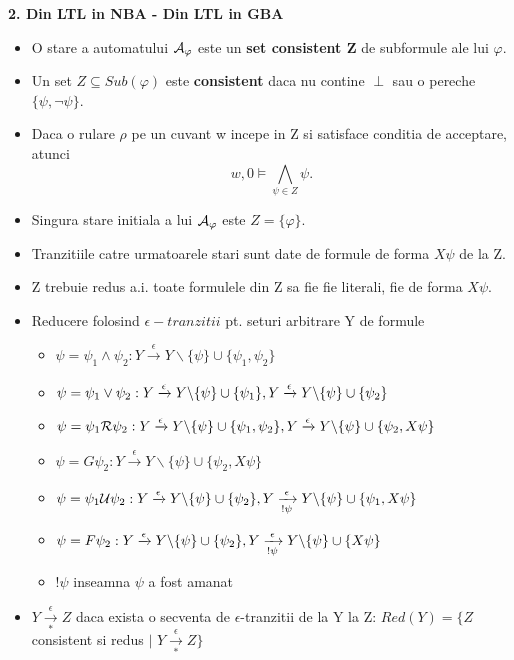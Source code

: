 \documentclass[10pt,a4paper,twocolumn]{report}
\begin{document}
\textbf{2. Din LTL in NBA - Din LTL in GBA}
\begin{itemize}
	\item  O stare a automatului $\mathcal{A}_\varphi$ este un \textbf{set consistent Z} de subformule ale lui $\varphi$.
	\item Un set $Z \subseteq Sub(\varphi)$ este \textbf{consistent} daca nu contine $\perp$ sau o pereche $\{\psi, \neg \psi\}$.
	\item Daca o rulare $\rho$ pe un cuvant w incepe in Z si satisface conditia de acceptare, atunci
	\[w,0 \models \bigwedge_{\psi\in Z} \psi.\]
	\item Singura stare initiala a lui $\mathcal{A}_\varphi$ este $Z = \{\varphi\}$.
	\item Tranzitiile catre urmatoarele stari sunt date de formule de forma $X\psi$ de la Z.
	\item Z trebuie redus a.i. toate formulele din Z sa fie fie literali, fie de forma $X\psi$.
	\item Reducere folosind \textbf{$\epsilon-tranzitii$} pt. seturi arbitrare Y de formule
	\begin{itemize}
		\item $\psi = \psi_1 \land \psi_2: Y \xrightarrow[]{\epsilon}Y\backslash\{\psi\} \cup \{\psi_1, \psi_2\}$
		\item $\psi = \psi_1 \lor \psi_2: Y \xrightarrow[]{\epsilon}Y\backslash\{\psi\} \cup \{\psi_1\},\\ Y \xrightarrow[]{\epsilon}Y\backslash\{\psi\} \cup \{\psi_2\}$
		\item $\psi = \psi_1 \mathcal{R} \psi_2: Y \xrightarrow[]{\epsilon}Y\backslash\{\psi\} \cup \{\psi_1, \psi_2\},\\ Y \xrightarrow[]{\epsilon}Y\backslash\{\psi\} \cup \{\psi_2, X\psi\}$
		\item $\psi = G\psi_2: Y \xrightarrow[]{\epsilon}Y\backslash\{\psi\} \cup \{\psi_2, X\psi\}$
		\item $\psi = \psi_1 \mathcal{U} \psi_2: Y \xrightarrow[]{\epsilon}Y\backslash\{\psi\} \cup \{\psi_2\},\\ Y \xrightarrow[!\psi]{\epsilon}Y\backslash\{\psi\} \cup \{\psi_1, X\psi\}$
		\item $\psi = F\psi_2: Y \xrightarrow[]{\epsilon}Y\backslash\{\psi\} \cup \{\psi_2\},\\ Y \xrightarrow[!\psi]{\epsilon}Y\backslash\{\psi\} \cup \{X\psi\}$
		\item $!\psi$ inseamna $\psi$ a fost amanat
	\end{itemize}
	\item $Y \xrightarrow[*]{\epsilon}Z$ daca exista o secventa de $\epsilon$-tranzitii de la Y la Z: $Red(Y) = \{Z$ consistent si redus $|$ $Y\xrightarrow[*]{\epsilon} Z\}$\\

\end{itemize}
\end{document}
